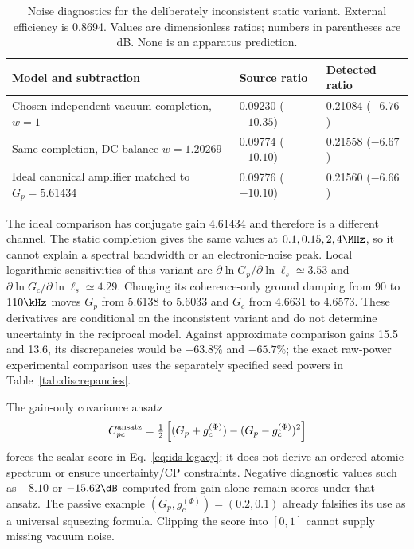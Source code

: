 \begin{table}[ht]
\centering\small
\caption{Noise diagnostics for the deliberately inconsistent static variant.
External efficiency is 0.8694. Values are dimensionless ratios; numbers in
parentheses are dB. None is an apparatus prediction.}
\label{tab:gc-countermodel-noise}
\begin{tabularx}{\textwidth}{Y L{3.2cm}L{3.2cm}}
\toprule
Model and subtraction&Source ratio&Detected ratio\\
\midrule
Chosen independent-vacuum completion, $w=1$&0.09230 ($-10.35$)&0.21084 ($-6.76$)\\
Same completion, DC balance $w=1.20269$&0.09774 ($-10.10$)&0.21558 ($-6.67$)\\
Ideal canonical amplifier matched to $G_p=5.61434$&0.09776 ($-10.10$)&0.21560 ($-6.66$)\\
\bottomrule
\end{tabularx}
\end{table}
The ideal comparison has conjugate gain 4.61434 and therefore is a different
channel. The static completion gives the same values at $0.1,0.15,2,4\MHz$,
so it cannot explain a spectral bandwidth or an electronic-noise peak.
Local logarithmic sensitivities of this variant are
$\partial\ln G_p/\partial\ln\ell_s\simeq3.53$ and
$\partial\ln G_c/\partial\ln\ell_s\simeq4.29$. Changing its coherence-only
ground damping from 90 to $110\kHz$ moves $G_p$ from 5.6138 to 5.6033 and
$G_c$ from 4.6631 to 4.6573. These derivatives are conditional on the
inconsistent variant and do not determine uncertainty in the reciprocal
model. Against approximate comparison gains 15.5 and 13.6, its discrepancies
would be $-63.8\%$ and $-65.7\%$; the exact raw-power experimental comparison
uses the separately specified seed powers in Table~\ref{tab:discrepancies}.

The gain-only covariance ansatz
\begin{equation}
 C_{pc}^{\rm ansatz}=\tfrac12\left[(G_p+g_c^{(\Phi)})
                    -(G_p-g_c^{(\Phi)})^2\right]
 \label{eq:gc-gain-covariance-ansatz}
\end{equation}
forces the scalar score in Eq.~\eqref{eq:ids-legacy}; it does not derive
an ordered atomic spectrum or ensure uncertainty/CP constraints. Negative
diagnostic values such as $-8.10$ or $-15.62\dB$ computed from gain alone
remain scores under that ansatz. The passive example $(G_p,g_c^{(\Phi)})=
(0.2,0.1)$ already falsifies its use as a universal squeezing formula.
Clipping the score into $[0,1]$ cannot supply missing vacuum noise.

